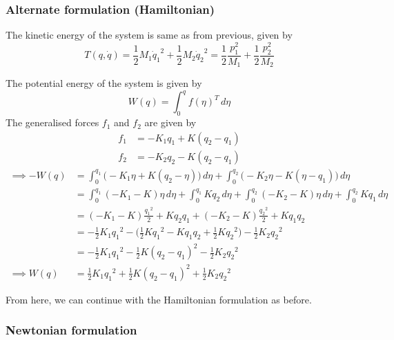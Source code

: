 \clearpage
\subsubsection*{Alternate formulation (Hamiltonian)}

The kinetic energy of the system is same as from previous, given by
\begin{equation*}
    T(q, \dot q)
    =
    \frac{1}{2} M_1 {\dot q_1}^2
    + \frac{1}{2} M_2 {\dot q_2}^2
    =
    \frac{1}{2} \frac{p_1^2}{M_1}
    + \frac{1}{2} \frac{p_2^2}{M_2}
\end{equation*}

The potential energy of the system is given by
\begin{equation*}
    W(q)
    =
    \int_{0}^{q} {f(\eta)}^T \, d\eta
\end{equation*}
The generalised forces \(f_1\) and \(f_2\) are given by
\begin{align*}
    f_1 & = -K_1 q_1 + K (q_2 - q_1) \\
    f_2 & = -K_2 q_2 - K (q_2 - q_1)
\end{align*}
\begin{align*}
    \implies
    - W(q)
     & =
    \int_{0}^{q_1} \Big( -K_1 \eta + K (q_2 - \eta) \Big)\, d\eta
    + \int_{0}^{q_2} \Big( -K_2 \eta - K (\eta - q_1) \Big)\, d\eta
    \\ & =
    \int_{0}^{q_1} (-K_1 - K)\eta \, d\eta
    + \int_{0}^{q_1} K q_2 \, d\eta
    + \int_{0}^{q_2} (-K_2 - K)\eta \, d\eta
    + \int_{0}^{q_2} K q_1 \, d\eta
    \\ & =
    (-K_1 - K) \frac{{q_1}^2}{2} + K q_2 q_1 + (-K_2 - K) \frac{{q_2}^2}{2} + K q_1 q_2
    \\ & =
    -\frac{1}{2} K_1 {q_1}^2 - \Big( \frac{1}{2} K {q_1}^2 - K q_1 q_2 + \frac{1}{2} K {q_2}^2 \Big) - \frac{1}{2} K_2 {q_2}^2
    \\ & =
    -\frac{1}{2} K_1 {q_1}^2 - \frac{1}{2} K {(q_2 - q_1)}^2 - \frac{1}{2} K_2 {q_2}^2
    \\
    \implies W(q)
     & =
    \frac{1}{2} K_1 {q_1}^2 + \frac{1}{2} K {(q_2 - q_1)}^2 + \frac{1}{2} K_2 {q_2}^2
\end{align*}

From here, we can continue with the Hamiltonian formulation as before.

\clearpage
\subsubsection*{Newtonian formulation}

